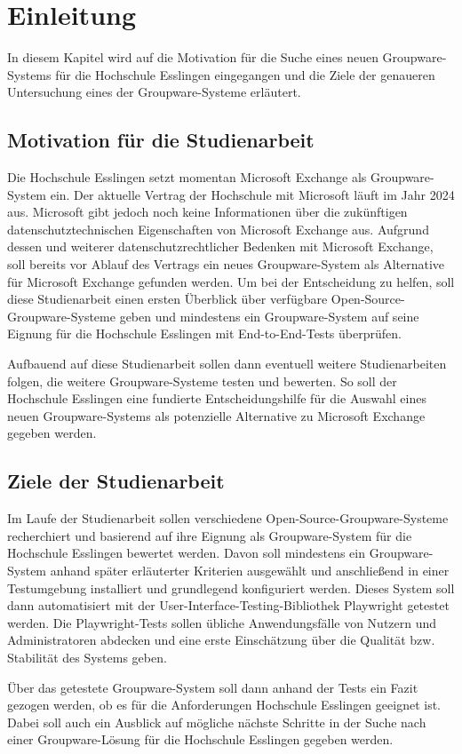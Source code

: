 
\chapter{Einleitung}

In diesem Kapitel wird auf die Motivation für die Suche eines neuen Groupware-Systems für die Hochschule Esslingen eingegangen und die Ziele der genaueren Untersuchung eines der Groupware-Systeme erläutert.


\section{Motivation für die Studienarbeit}

Die Hochschule Esslingen setzt momentan Microsoft Exchange als Groupware-System ein.
Der aktuelle Vertrag der Hochschule mit Microsoft läuft im Jahr 2024 aus.
Microsoft gibt jedoch noch keine Informationen über die zukünftigen datenschutztechnischen Eigenschaften von Microsoft Exchange aus.
Aufgrund dessen und weiterer datenschutzrechtlicher Bedenken mit Microsoft Exchange, soll bereits vor Ablauf des Vertrags ein neues Groupware-System als Alternative für Microsoft Exchange gefunden werden.
Um bei der Entscheidung zu helfen, soll diese Studienarbeit einen ersten Überblick über verfügbare Open-Source-Groupware-Systeme geben und mindestens ein Groupware-System auf seine Eignung für die Hochschule Esslingen mit End-to-End-Tests überprüfen.

Aufbauend auf diese Studienarbeit sollen dann eventuell weitere Studienarbeiten folgen, die weitere Groupware-Systeme testen und bewerten.
So soll der Hochschule Esslingen eine fundierte Entscheidungshilfe für die Auswahl eines neuen Groupware-Systems als potenzielle Alternative zu Microsoft Exchange gegeben werden.


\section{Ziele der Studienarbeit}

Im Laufe der Studienarbeit sollen verschiedene Open-Source-Groupware-Systeme recherchiert und basierend auf ihre Eignung als Groupware-System für die Hochschule Esslingen bewertet werden.
Davon soll mindestens ein Groupware-System anhand später erläuterter Kriterien ausgewählt und anschließend in einer Testumgebung installiert und grundlegend konfiguriert werden.
Dieses System soll dann automatisiert mit der User-Interface-Testing-Bibliothek Playwright getestet werden.
Die Playwright-Tests sollen übliche Anwendungsfälle von Nutzern und Administratoren abdecken und eine erste Einschätzung über die Qualität bzw. Stabilität des Systems geben.

Über das getestete Groupware-System soll dann anhand der Tests ein Fazit gezogen werden, ob es für die Anforderungen Hochschule Esslingen geeignet ist.
Dabei soll auch ein Ausblick auf mögliche nächste Schritte in der Suche nach einer Groupware-Lösung für die Hochschule Esslingen gegeben werden.


